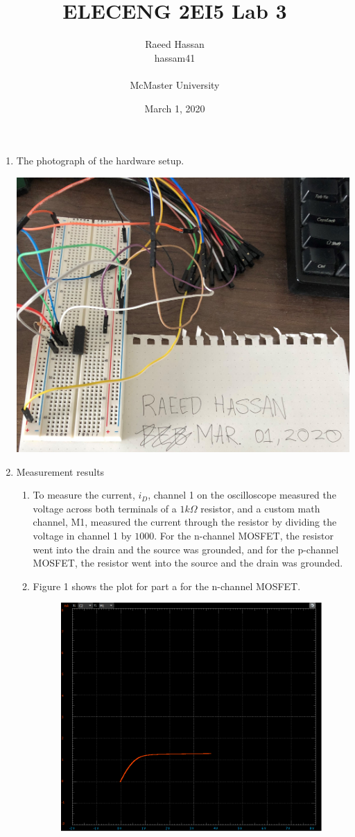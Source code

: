 \documentclass[12pt]{article}
\title{ELECENG 2EI5 Lab 3}
\author{Raeed Hassan \\ hassam41 \\  \\ McMaster University}
\date{March 1, 2020}
\begin{document}
\maketitle
\pagebreak

\begin{enumerate}
    \item The photograph of the hardware setup.
    \begin{center}
        \includegraphics[width=\linewidth]{images/Setup.png}
    \end{center}
    \item Measurement results
    \begin{enumerate}
        \item To measure the current, $i_D$, channel 1 on the oscilloscope measured the voltage across both terminals of a $1k\Omega$ resistor, and a custom math channel, M1, measured the current through the resistor by dividing the voltage in channel 1 by $1000$. For the n-channel MOSFET, the resistor went into the drain and the source was grounded, and for the p-channel MOSFET, the resistor went into the source and the drain was grounded. \pagebreak
        \item
        Figure 1 shows the plot for part a for the n-channel MOSFET.
        \begin{figure}[h!]
            \centering
            \includegraphics[width=0.5\linewidth]{NAVG3.png}

\end{figure}
\end{enumerate}
\end{enumerate}
\end{document}
